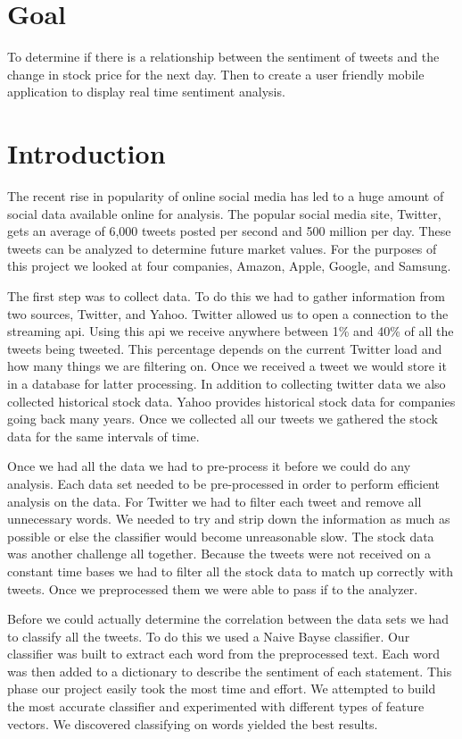 \documentclass{acm_proc_article-sp}
\begin{document}
\section*{Goal}

To determine if there is a relationship between the sentiment of tweets and the
change in stock price for the next day. Then to create a user friendly mobile
application to display real time sentiment analysis.

\section{Introduction}

The recent rise in popularity of online social media has led to a huge amount
of social data available online for analysis. The popular social media site,
Twitter, gets an average of 6,000 tweets posted per second and 500 million per
day. These tweets can be analyzed to determine future market values. For the
purposes of this project we looked at four companies, Amazon, Apple, Google,
and Samsung. 

The first step was to collect data. To do this we had to gather information
from two sources, Twitter, and Yahoo.  Twitter allowed us to open a connection
to the streaming api. Using this api we receive anywhere between 1\% and 40\%
of all the tweets being tweeted.  This percentage depends on the current
Twitter load and how many things we are filtering on. Once we received a tweet
we would store it in a database for latter processing.  In addition to
collecting twitter data we also collected historical stock data. Yahoo provides
historical stock data for companies going back many years. Once we collected
all our tweets we gathered the stock data for the same intervals of time.

Once we had all the data we had to pre-process it before we could do any
analysis. Each data set needed to be pre-processed in order to perform
efficient analysis on the data. For Twitter we had to filter each tweet and
remove all unnecessary words. We needed to try and strip down the information
as much as possible or else the classifier would become unreasonable slow. The
stock data was another challenge all together. Because the tweets were not
received on a constant time bases we had to filter all the stock data to match
up correctly with tweets. Once we preprocessed them we were able to pass if to
the analyzer.

Before we could actually determine the correlation between the data sets we had
to classify all the tweets.  To do this we used a Naive Bayse classifier. Our
classifier was built to extract each word from the preprocessed text. Each word
was then added to a dictionary to describe the sentiment of each statement.
This phase our project easily took the most time and effort. We attempted to
build the most accurate classifier and experimented with different types of
feature vectors. We discovered classifying on words yielded the best results.
\end{document}
